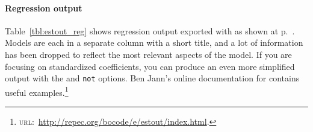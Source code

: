 \paragraph{Regression output} Table~\ref{tbl:estout_reg} shows regression output exported with  as shown at p.~\pageref{tbl:hibbs_yx1_estout}. Models are each in a separate column with a short title, and a lot of information has been dropped to reflect the most relevant aspects of the model. If you are focusing on standardized coefficients, you can produce an even more simplified output with the  and \texttt{not} options. Ben Jann's online documentation for  contains useful examples.\footnote{\textsc{url:}~\url{http://repec.org/bocode/e/estout/index.html}.}

{
	\renewcommand\arraystretch{1.5}

	\begin{table}[htp]

\end{table}}
